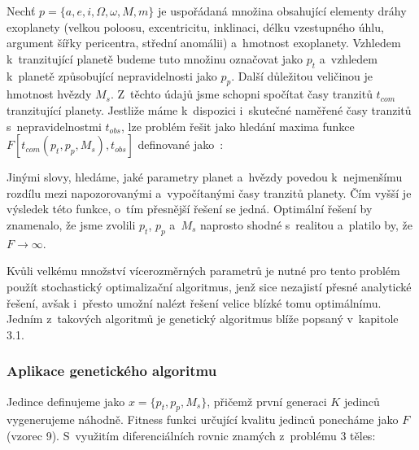 \documentclass[a4paper,12pt]{article}
\begin{document}
{{{Nechť $p = \{a, e, i, \Omega, \omega, M, m\}$ je uspořádaná množina obsahující elementy dráhy exoplanety (velkou poloosu, excentricitu, inklinaci, délku vzestupného úhlu, argument šířky pericentra, střední anomálii) a~hmotnost exoplanety. Vzhledem k~tranzitující planetě budeme tuto množinu označovat jako $p_t$ a~vzhledem k~planetě způsobující nepravidelnosti jako $p_p$. Další důležitou veličinou je hmotnost hvězdy $M_s$. Z~těchto údajů jsme schopni spočítat časy tranzitů $t_{com}$ tranzitující planety. Jestliže máme k~dispozici i~skutečné naměřené časy tranzitů s~nepravidelnostmi $t_{obs}$, lze problém řešit jako hledání maxima funkce $F[t_{com}(p_t, p_p, M_s), t_{obs}]$ definované jako~\cite{ttv}:


Jinými slovy, hledáme, jaké parametry planet a~hvězdy povedou k~nejmenšímu rozdílu mezi napozorovanými a~vypočítanými časy tranzitů planety. Čím vyšší je výsledek této funkce, o~tím přesnější řešení se jedná. Optimální řešení by znamenalo, že jsme zvolili $p_t$, $p_p$ a~$M_s$ naprosto shodné s~realitou a~platilo by, že $F\to\infty$.

Kvůli velkému množství vícerozměrných parametrů je nutné pro tento problém použít stochastický optimalizační algoritmus, jenž sice nezajistí přesné analytické řešení, avšak i~přesto umožní nalézt řešení velice blízké tomu optimálnímu. Jedním z~takových algoritmů je genetický algoritmus blíže popsaný v~kapitole 3.1.~\cite{ttv}

\subsubsection{Aplikace genetického algoritmu}

Jedince definujeme jako $x = \{p_t, p_p, M_s\}$, přičemž první generaci $K$ jedinců vygenerujeme náhodně. Fitness funkci určující kvalitu jedinců ponecháme jako $F$ (vzorec 9). S~využitím diferenciálních rovnic znamých z~problému 3 těles:


}}}
\end{document}

